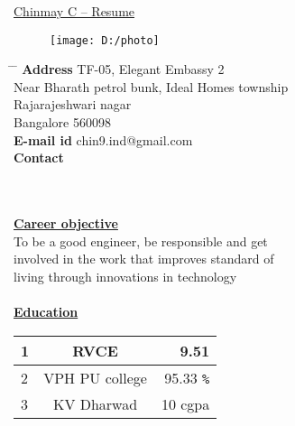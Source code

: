 \documentclass[10pt]{article}
\begin{document}
	
\begin{tabbing}
	\hspace{1cm}
	\underline{\LARGE{Chinmay C -- Resume}} %
\end{tabbing}

	\begin{figure}[h]
		\texttt{[image: D:/photo]}
	\end{figure}
	
\parbox{1.5\textwidth}{ %
	\begin{tabbing} %
		\hspace{3cm} \= \hspace{4cm} \= \kill %
		{\bf Address} \> TF-05, Elegant Embassy 2\\ %
		\> Near Bharath petrol bunk, Ideal Homes township\\ %
		\> Rajarajeshwari nagar\\ %
		\> Bangalore 560098\\ %
		{\bf E-mail id} \> chin9.ind@gmail.com  \\ %
		{\bf Contact}   \\ %
	\end{tabbing}}
	\hfill\\
	\hfill\\
	\hfill %
	\underline{\textbf{\Large{Career objective}}}\\
	
	To be a good engineer, be responsible and get\\ involved in the work that improves standard of\\ living through innovations in technology\\
	
	\hfill\\	
	\underline{\textbf{\Large{Education}}}
	\vspace{1cm}
	
	\begin{tabular}{|l|c|r|}
		\hline
		1 & RVCE & 9.51 \\
		\hline
		2 & VPH PU college & 95.33 \verb|%| \\
		\hline
		3 & KV Dharwad & 10 cgpa \\
		\hline
	\end{tabular}

	\hfill
	\vspace{1cm}
	
\end{document}
